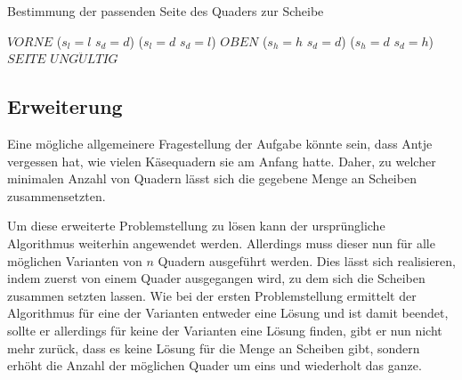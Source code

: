 \documentclass[a4paper,10pt,ngerman]{scrartcl}
\begin{document}
    \begin{algorithm}[H]
        \caption{Bestimmung der passenden Seite des Quaders zur Scheibe}
        \label{alg:cheese2}
        \begin{algorithmic}
                    \State \Return $VORNE$
                \ElsIf
                        {($s_{l} = l$ \land $s_{d} = d$) \lor ($s_{l} = d$ \land $s_{d} = l$)}
                    \State \Return $OBEN$
                \ElsIf
                        {($s_{h} = h$ \land $s_{d} = d$) \lor ($s_{h} = d$ \land $s_{d} = h$)}
                    \State \Return $SEITE$
                \Else
                    \State \Return $UNG\ddot ULTIG$
                \EndIf
            \EndFunction
        \end{algorithmic}
    \end{algorithm}

    \subsection{Erweiterung}\label{subsec:erweiterung_losungsidee}

    Eine mögliche allgemeinere Fragestellung der Aufgabe könnte sein, dass Antje vergessen hat,
    wie vielen Käsequadern sie am Anfang hatte.
    Daher, zu welcher minimalen Anzahl von Quadern lässt sich die gegebene Menge an Scheiben zusammensetzten.

    Um diese erweiterte Problemstellung zu lösen kann der ursprüngliche Algorithmus weiterhin angewendet werden.
    Allerdings muss dieser nun für alle möglichen Varianten von $n$ Quadern ausgeführt werden.
    Dies lässt sich realisieren, indem zuerst von einem Quader ausgegangen wird, zu dem sich die Scheiben zusammen setzten lassen.
    Wie bei der ersten Problemstellung ermittelt der Algorithmus für eine der Varianten entweder eine Lösung und ist damit beendet,
    sollte er allerdings für keine der Varianten eine Lösung finden, gibt er nun nicht mehr zurück, dass es keine Lösung für die Menge an Scheiben gibt,
    sondern erhöht die Anzahl der möglichen Quader um eins und wiederholt das ganze.
\end{document}
